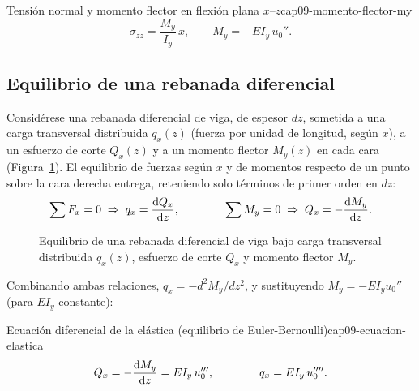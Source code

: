\begin{ecnimportante}{Tensión normal y momento flector en flexión plana \texorpdfstring{$x$--$z$}{x-z}}{cap09-momento-flector-my}
\[
\sigma_{zz} = \frac{M_y}{I_y}\,x , \qquad M_y = -EI_y\,u_0'' .
\]
\end{ecnimportante}

\subsection{Equilibrio de una rebanada diferencial}
\label{sec:cap09-equilibrio-rebanada}

Considérese una rebanada diferencial de viga, de espesor $dz$, sometida a una carga transversal distribuida $q_x(z)$ (fuerza por unidad de longitud, según $x$), a un esfuerzo de corte $Q_x(z)$ y a un momento flector $M_y(z)$ en cada cara (Figura~\ref{fig:cap09-rebanada-diferencial}). El equilibrio de fuerzas según $x$ y de momentos respecto de un punto sobre la cara derecha entrega, reteniendo solo términos de primer orden en $dz$:
\[
\sum F_x = 0 \;\Rightarrow\; q_x = \dv{Q_x}{z} , \qquad\qquad
\sum M_y = 0 \;\Rightarrow\; Q_x = -\dv{M_y}{z} .
\]

\begin{figure}[htbp]
\centering
{}
\caption{Equilibrio de una rebanada diferencial de viga bajo carga transversal distribuida $q_x(z)$, esfuerzo de corte $Q_x$ y momento flector $M_y$.}
\label{fig:cap09-rebanada-diferencial}
\end{figure}

Combinando ambas relaciones, $q_x=-d^2M_y/dz^2$, y sustituyendo $M_y=-EI_y u_0''$ (para $EI_y$ constante):

\begin{ecnimportante}{Ecuación diferencial de la elástica (equilibrio de Euler-Bernoulli)}{cap09-ecuacion-elastica}
\[
Q_x = -\dv{M_y}{z} = EI_y\,u_0''' , \qquad\qquad q_x = EI_y\,u_0'''' .
\]
\end{ecnimportante}

